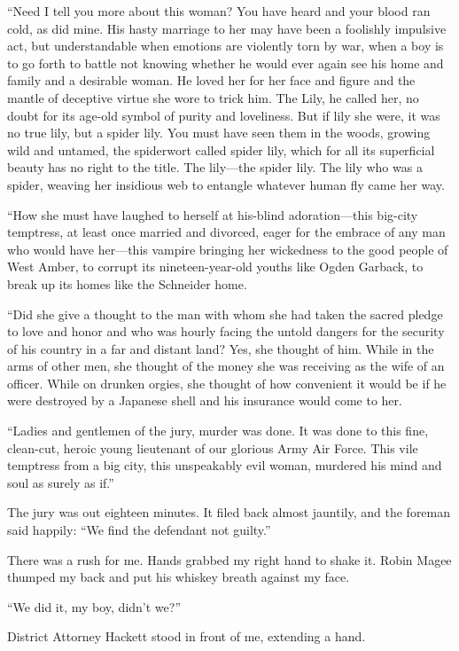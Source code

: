 \documentclass{novel}
\begin{document}
“Need I tell you more about this woman? You have heard and your blood ran cold, as did mine. His hasty marriage to her may have been a foolishly impulsive act, but understandable when emotions are violently torn by war, when a boy is to go forth to battle not knowing whether he would ever again see his home and family and a desirable woman. He loved her for her face and figure and the mantle of deceptive virtue she wore to trick him. The Lily, he called her, no doubt for its age-old symbol of purity and loveliness. But if lily she were, it was no true lily, but a spider lily. You must have seen them in the woods, growing wild and untamed, the spiderwort called spider lily, which for all its superficial beauty has no right to the title. The lily—the spider lily. The lily who was a spider, weaving her insidious web to entangle whatever human fly came her way.

“How she must have laughed to herself at his-blind adoration—this big-city temptress, at least once married and divorced, eager for the embrace of any man who would have her—this vampire bringing her wickedness to the good people of West Amber, to corrupt its nineteen-year-old youths like Ogden Garback, to break up its homes like the Schneider home.

“Did she give a thought to the man with whom she had taken the sacred pledge to love and honor and who was hourly facing the untold dangers for the security of his country in a far and distant land? Yes, she thought of him. While in the arms of other men, she thought of the money she was receiving as the wife of an officer. While on drunken orgies, she thought of how convenient it would be if he were destroyed by a Japanese shell and his insurance would come to her.

“Ladies and gentlemen of the jury, murder was done. It was done to this fine, clean-cut, heroic young lieutenant of our glorious Army Air Force. This vile temptress from a big city, this unspeakably evil woman, murdered his mind and soul as surely as if.”

\scenestars

The jury was out eighteen minutes. It filed back almost jauntily, and the foreman said happily: “We find the defendant not guilty.”

There was a rush for me. Hands grabbed my right hand to shake it. Robin Magee thumped my back and put his whiskey breath against my face. 

“We did it, my boy, didn’t we?”

District Attorney Hackett stood in front of me, extending a hand. 
\end{document}
